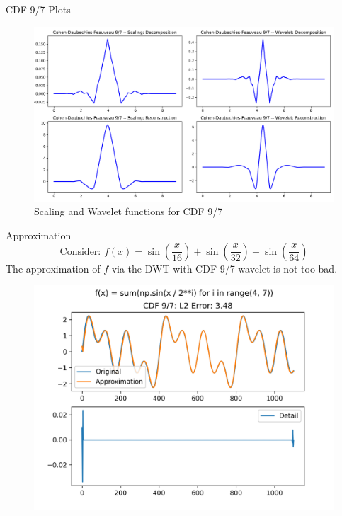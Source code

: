 \documentclass[9pt]{beamer}
\begin{document}
\begin{frame}{CDF 9/7 Plots}
	\begin{figure}[h]
		\centering
		\includegraphics[width=\textwidth]{./plots/cdf97.png}
		\caption{Scaling and Wavelet functions for CDF 9/7}
	\end{figure}
\end{frame}
\begin{frame}{Approximation}
		\begin{equation*}
			\text{Consider:     }f(x) = \sin\left(\frac x {16}\right) + \sin\left(\frac x {32}\right) + \sin\left(\frac x {64}\right)
		\end{equation*}
		The approximation of $f$ via the DWT with CDF 9/7 wavelet is not too bad.
		\begin{figure}[h]
			\centering
			\includegraphics[scale=0.5]{./plots/cdf97_dwt.png}
		\end{figure}
\end{frame}
\end{document}
